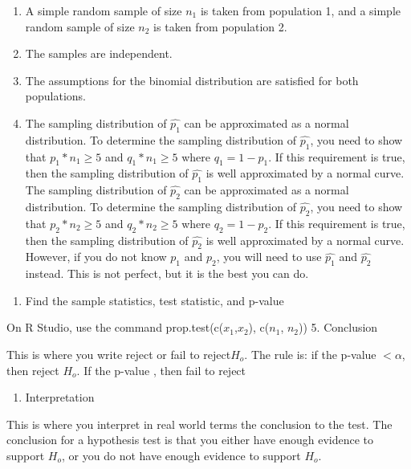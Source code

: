 \documentclass[]{book}
\providecommand{\tightlist}{%
  \setlength{\itemsep}{0pt}\setlength{\parskip}{0pt}}
\begin{document}
\begin{enumerate}
\def\labelenumi{\alph{enumi}.}
\item
  A simple random sample of size \(n_1\) is taken from population 1, and a simple random sample of size \(n_2\) is taken from population 2.
\item
  The samples are independent.
\item
  The assumptions for the binomial distribution are satisfied for both populations.
\item
  The sampling distribution of \(\hat{p_1}\) can be approximated as a normal distribution. To determine the sampling distribution of \(\hat{p_1}\), you need to show that \(p_1*n_1\ge5\) and \(q_1*n_1\ge5\) where \(q_1=1-p_1\). If this requirement is true, then the sampling distribution of \(\hat{p_1}\) is well approximated by a normal curve. The sampling distribution of \(\hat{p_2}\) can be approximated as a normal distribution. To determine the sampling distribution of \(\hat{p_2}\), you need to show that \(p_2*n_2\ge 5\) and \(q_2*n_2\ge 5\) where \(q_2=1-p_2\). If this requirement is true, then the sampling distribution of \(\hat{p_2}\) is well approximated by a normal curve. However, if you do not know \(p_1\) and \(p_2\), you will need to use \(\hat{p_1}\) and \(\hat{p_2}\) instead. This is not perfect, but it is the best you can do.
\end{enumerate}

\begin{enumerate}
\def\labelenumi{\arabic{enumi}.}
\setcounter{enumi}{3}
\tightlist
\item
  Find the sample statistics, test statistic, and p-value
\end{enumerate}

On R Studio, use the command prop.test(c(\(x_1\),\(x_2\)), c(\(n_1\), \(n_2\)))
5. Conclusion

This is where you write reject or fail to reject\(H_o\). The rule is: if the p-value \(<\alpha\), then reject \(H_o\). If the p-value , then fail to reject

\begin{enumerate}
\def\labelenumi{\arabic{enumi}.}
\setcounter{enumi}{5}
\tightlist
\item
  Interpretation
\end{enumerate}

This is where you interpret in real world terms the conclusion to the test. The conclusion for a hypothesis test is that you either have enough evidence to support \(H_o\), or you do not have enough evidence to support \(H_o\).
\end{document}
